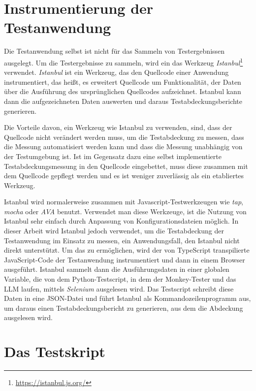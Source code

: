 \section{Instrumentierung der Testanwendung}

Die Testanwendung selbst ist nicht für das Sammeln von Testergebnissen ausgelegt.
Um die Testergebnisse zu sammeln, wird ein das Werkzeug \textit{Istanbul}\footnote{\url{https://istanbul.js.org/}} verwendet.
\textit{Istanbul} ist ein Werkzeug, das den Quellcode einer Anwendung instrumentiert, das heißt, es erweitert Quellcode um Funktionalität, der Daten über die Ausführung des ursprünglichen Quellcodes aufzeichnet.
Istanbul kann dann die aufgezeichneten Daten auswerten und daraus Testabdeckungsberichte generieren.

Die Vorteile davon, ein Werkzeug wie Istanbul zu verwenden, sind, dass der Quellcode nicht verändert werden muss, um die Testabdeckung zu messen, dass die Messung automatisiert werden kann und dass die Messung unabhängig von der Testumgebung ist.
Ist im Gegensatz dazu eine selbst implementierte Testabdeckungsmessung in den Quellcode eingebettet, muss diese zusammen mit dem Quellcode gepflegt werden und es ist weniger zuverlässig als ein etabliertes Werkzeug.

Istanbul wird normalerweise zusammen mit Javascript-Testwerkzeugen wie \textit{tap}, \textit{mocha} oder \textit{AVA} benutzt.
Verwendet man diese Werkzeuge, ist die Nutzung von Istanbul sehr einfach durch Anpassung von Konfigurationsdateien möglich.
In dieser Arbeit wird Istanbul jedoch verwendet, um die Testabdeckung der Testanwendung im Einsatz zu messen, ein Anwendungsfall, den Istanbul nicht direkt unterstützt.
Um das zu ermöglichen, wird der von TypeScript transpilierte JavaScript-Code der Testanwendung instrumentiert und dann in einem Browser ausgeführt.
Istanbul sammelt dann die Ausführungsdaten in einer globalen Variable, die von dem Python-Testscript, in dem der Monkey-Tester und das LLM laufen, mittels \textit{Selenium} ausgelesen wird.
Das Testscript schreibt diese Daten in eine JSON-Datei und führt Istanbul als Kommandozeilenprogramm aus, um daraus einen Testabdeckungsbericht zu generieren, aus dem die Abdeckung ausgelesen wird.

\section{Das Testskript}

